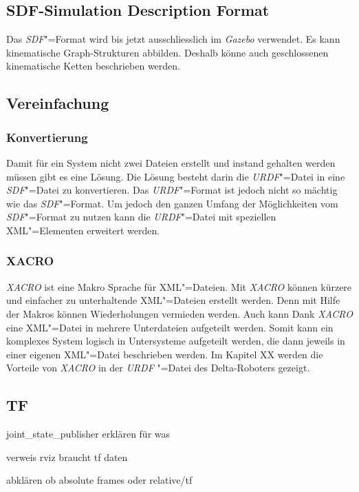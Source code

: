 \subsection{SDF-Simulation Description Format}
Das \textit{SDF}"=Format wird bis jetzt ausschliesslich im \textit{Gazebo} verwendet.
Es kann kinematische Graph-Strukturen abbilden.
Deshalb könne auch geschlossenen kinematische Ketten beschrieben werden.

\subsection{Vereinfachung}
\subsubsection{Konvertierung}
Damit für ein System nicht zwei Dateien erstellt und instand gehalten werden müssen gibt es eine Lösung.
Die Lösung besteht darin die \textit{URDF}"=Datei in eine \textit{SDF}"=Datei zu konvertieren.
Das \textit{URDF}"=Format ist jedoch nicht so mächtig wie das \textit{SDF}"=Format.
Um jedoch den ganzen Umfang der Möglichkeiten vom \textit{SDF}"=Format zu nutzen kann die \textit{URDF}"=Datei mit speziellen XML"=Elementen erweitert werden.

\subsubsection{XACRO}
\textit{XACRO} ist eine Makro Sprache für XML"=Dateien. %
Mit \textit{XACRO} können kürzere und einfacher zu unterhaltende XML"=Dateien erstellt werden.
Denn mit Hilfe der Makros können Wiederholungen vermieden werden.
Auch kann Dank \textit{XACRO} eine XML"=Datei in mehrere Unterdateien aufgeteilt werden.
Somit kann ein komplexes System logisch in Untersysteme aufgeteilt werden, die dann jeweils in einer eigenen XML"=Datei beschrieben werden. 
Im Kapitel XX werden die Vorteile von \textit{XACRO} in der \textit{URDF} "=Datei des Delta-Roboters gezeigt.

\subsection{TF}
joint_state_publisher erklären für was

verweis rviz braucht tf daten

abklären ob absolute frames oder relative/tf

